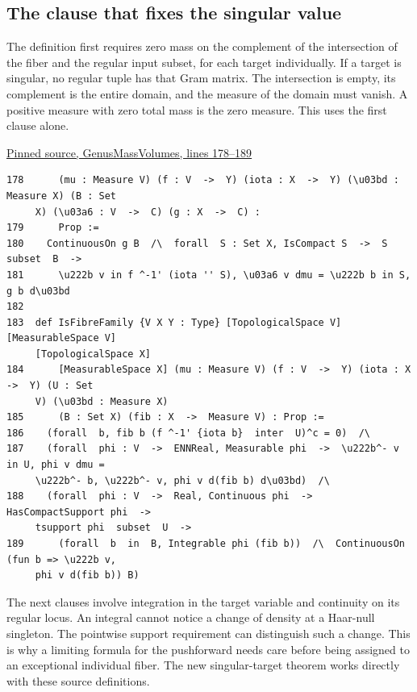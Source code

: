\documentclass[12pt,letterpaper]{article}
\begin{document}
\clearpage\subsection*{The clause that fixes the singular value}

The definition first requires zero mass on the complement of the intersection of the fiber and the regular input subset, for each target individually. If a target is singular, no regular tuple has that Gram matrix. The intersection is empty, its complement is the entire domain, and the measure of the domain must vanish. A positive measure with zero total mass is the zero measure. This uses the first clause alone.

\par\smallskip\href{https://github.com/nousentllc/riemann-hypothesis/blob/40e56bab026552e089d7afcfeff08d2defb9c005/src/Formalism/SharpRestriction/GlobalSchurBounds/GeneralLinearActions/GenusMassVolumes.lean#L178-L189}{\sffamily\small Pinned source, GenusMassVolumes, lines 178--189}\par

{\footnotesize\begin{verbatim}
178      (mu : Measure V) (f : V  ->  Y) (iota : X  ->  Y) (\u03bd : Measure X) (B : Set
     X) (\u03a6 : V  ->  C) (g : X  ->  C) :
179      Prop :=
180    ContinuousOn g B  /\  forall  S : Set X, IsCompact S  ->  S  subset  B  ->
181      \u222b v in f ^-1' (iota '' S), \u03a6 v dmu = \u222b b in S, g b d\u03bd
182  
183  def IsFibreFamily {V X Y : Type} [TopologicalSpace V] [MeasurableSpace V]
     [TopologicalSpace X]
184      [MeasurableSpace X] (mu : Measure V) (f : V  ->  Y) (iota : X  ->  Y) (U : Set
     V) (\u03bd : Measure X)
185      (B : Set X) (fib : X  ->  Measure V) : Prop :=
186    (forall  b, fib b (f ^-1' {iota b}  inter  U)^c = 0)  /\
187    (forall  phi : V  ->  ENNReal, Measurable phi  ->  \u222b^- v in U, phi v dmu =
     \u222b^- b, \u222b^- v, phi v d(fib b) d\u03bd)  /\
188    (forall  phi : V  ->  Real, Continuous phi  ->  HasCompactSupport phi  ->
     tsupport phi  subset  U  ->
189      (forall  b  in  B, Integrable phi (fib b))  /\  ContinuousOn (fun b => \u222b v,
     phi v d(fib b)) B)
\end{verbatim}
}

The next clauses involve integration in the target variable and continuity on its regular locus. An integral cannot notice a change of density at a Haar-null singleton. The pointwise support requirement can distinguish such a change. This is why a limiting formula for the pushforward needs care before being assigned to an exceptional individual fiber. The new singular-target theorem works directly with these source definitions.
\end{document}
